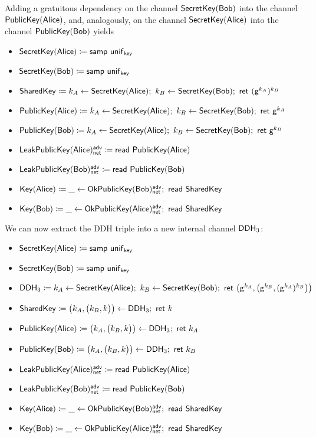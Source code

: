 \noindent Adding a gratuitous dependency on the channel $\mathsf{SecretKey}(\mathsf{Bob})$ into the channel $\mathsf{PublicKey}(\mathsf{Alice})$, and, analogously, on the channel $\mathsf{SecretKey}(\mathsf{Alice})$ into the channel $\mathsf{PublicKey}(\mathsf{Bob})$ yields

\begin{itemize}
\item $\mathsf{SecretKey}(\mathsf{Alice}) \coloneqq \mathsf{samp} \ \mathsf{unif}_{\mathsf{key}}$
\item $\mathsf{SecretKey}(\mathsf{Bob}) \coloneqq \mathsf{samp} \ \mathsf{unif}_{\mathsf{key}}$
\item $\SharedKey \coloneqq k_A \leftarrow \SecretKey(\Alice); \ k_B \leftarrow \SecretKey(\Bob); \ \ret{(\gen^{k_A})^{k_B}}$
\item {\color{red} $\PublicKey(\Alice) \coloneqq k_A \leftarrow \SecretKey(\Alice); \ k_B \leftarrow \SecretKey(\Bob); \ \ret{\gen^{k_A}}$}
\item {\color{red} $\PublicKey(\Bob) \coloneqq k_A \leftarrow \SecretKey(\Alice); \ k_B \leftarrow \SecretKey(\Bob); \ \ret{\gen^{k_B}}$}
\item $\mathsf{LeakPublicKey}(\mathsf{Alice})^{\mathsf{adv}}_{\mathsf{net}} \coloneqq \mathsf{read} \ \mathsf{PublicKey}(\mathsf{Alice})$
\item $\mathsf{LeakPublicKey}(\mathsf{Bob})^{\mathsf{adv}}_{\mathsf{net}} \coloneqq \mathsf{read} \ \mathsf{PublicKey}(\mathsf{Bob})$
\item $\mathsf{Key}(\mathsf{Alice}) \coloneqq \_ \leftarrow \mathsf{OkPublicKey}(\mathsf{Bob})^{\mathsf{adv}}_{\mathsf{net}}; \ \mathsf{read} \ \mathsf{SharedKey}$
\item $\mathsf{Key}(\mathsf{Bob}) \coloneqq \_ \leftarrow \mathsf{OkPublicKey}(\mathsf{Alice})^{\mathsf{adv}}_{\mathsf{net}}; \ \mathsf{read} \ \mathsf{SharedKey}$
\end{itemize}

\noindent We can now extract the DDH triple into a new internal channel $\mathsf{DDH}_3$:

\begin{itemize}
\item $\mathsf{SecretKey}(\mathsf{Alice}) \coloneqq \mathsf{samp} \ \mathsf{unif}_{\mathsf{key}}$
\item $\mathsf{SecretKey}(\mathsf{Bob}) \coloneqq \mathsf{samp} \ \mathsf{unif}_{\mathsf{key}}$
\item {\color{red} $\DDH_3 \coloneqq k_A \leftarrow \SecretKey(\Alice); \ k_B \leftarrow \SecretKey(\Bob); \ \ret{\big(\gen^{k_A}, \big(\gen^{k_B}, (\gen^{k_A})^{k_B}\big)\big)}$}
\item {\color{red} $\SharedKey \coloneqq \big(k_A,\big(k_B,k\big)\big) \leftarrow \DDH_3; \ \ret{k}$}
\item {\color{red} $\PublicKey(\Alice) \coloneqq \big(k_A,\big(k_B,k\big)\big) \leftarrow \DDH_3; \ \ret{k_A}$}
\item {\color{red} $\PublicKey(\Bob) \coloneqq \big(k_A,\big(k_B,k\big)\big) \leftarrow \DDH_3; \ \ret{k_B}$}
\item $\mathsf{LeakPublicKey}(\mathsf{Alice})^{\mathsf{adv}}_{\mathsf{net}} \coloneqq \mathsf{read} \ \mathsf{PublicKey}(\mathsf{Alice})$
\item $\mathsf{LeakPublicKey}(\mathsf{Bob})^{\mathsf{adv}}_{\mathsf{net}} \coloneqq \mathsf{read} \ \mathsf{PublicKey}(\mathsf{Bob})$
\item $\mathsf{Key}(\mathsf{Alice}) \coloneqq \_ \leftarrow \mathsf{OkPublicKey}(\mathsf{Bob})^{\mathsf{adv}}_{\mathsf{net}}; \ \mathsf{read} \ \mathsf{SharedKey}$
\item $\mathsf{Key}(\mathsf{Bob}) \coloneqq \_ \leftarrow \mathsf{OkPublicKey}(\mathsf{Alice})^{\mathsf{adv}}_{\mathsf{net}}; \ \mathsf{read} \ \mathsf{SharedKey}$
\end{itemize}

